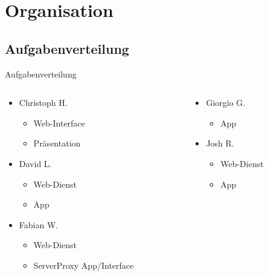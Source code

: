 \documentclass[19pt]{beamer}
\begin{document}
\section{Organisation}

\subsection{Aufgabenverteilung}
\begin{frame}{Aufgabenverteilung}
  \begin{columns}[T]
    \begin{column}{.5\textwidth}
    		\begin{itemize}
    	\item Christoph H.
			\begin{itemize}
				\item Web-Interface
				\item Präsentation
			\end{itemize}
		\item David L.
			\begin{itemize}
				\item Web-Dienst
				\item App
			\end{itemize}
		\item Fabian W.
			\begin{itemize}
				\item Web-Dienst
				\item ServerProxy App/Interface
			\end{itemize}
    		\end{itemize}
    \end{column}
    \begin{column}{.5\textwidth}
    \begin{itemize}
		\item Giorgio G.
			\begin{itemize}
				\item App
			\end{itemize}
		\item Josh R.
			\begin{itemize}
				\item Web-Dienst
				\item App
			\end{itemize}
	\end{itemize}
    \end{column}
  \end{columns}
\end{frame}
\end{document}
